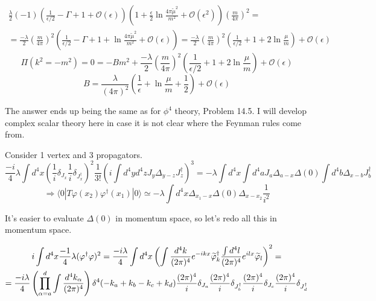 \documentclass[twoside]{amsart}
\newcommand{\solutionhead}[1]
  {\smallskip
   \noindent{\large\bf Solution #1.}
   }
\begin{document}
\[
\begin{gathered}
  \frac{ \lambda}{2} (-1) \left( \frac{1}{ \epsilon/2} -\Gamma +1 + \mathcal{O}(\epsilon) \right) \left( 1 + \frac{ \epsilon}{2} \ln{ \frac{ 4\pi \widetilde{\mu}^2 }{ m^2} }+ \mathcal{O}(\epsilon^2) \right) \left( \frac{m}{4\pi} \right)^2  = \\ 
  = \frac{ -\lambda}{2} \left( \frac{ m}{4\pi} \right)^2 \left( \frac{1}{ \epsilon/2} - \Gamma + 1 + \ln{ \frac{ 4\pi \widetilde{\mu}^2}{ m^2 }} + \mathcal{O}(\epsilon) \right) = \frac{ - \lambda}{2} \left( \frac{m}{4\pi} \right)^2 \left( \frac{1}{ \epsilon/2} + 1 + 2 \ln{ \frac{ \mu}{m}} \right) + \mathcal{O}(\epsilon) 
\end{gathered}
\]
\[
\Pi(k^2 =  - m^2 ) = 0 = - Bm^2 + \frac{ -\lambda}{2} \left( \frac{m}{4\pi} \right)^2 \left( \frac{1}{ \epsilon/2} + 1 + 2 \ln{ \frac{ \mu}{m }  } \right) + \mathcal{O}(\epsilon) 
\]
\[
\boxed{ B = \frac{ \lambda}{  ( 4\pi)^2 } \left( \frac{1}{ \epsilon} + \ln{ \frac{ \mu}{m} } + \frac{1}{2} \right) + \mathcal{O}(\epsilon) }
\]











\solutionhead{14.6} 

The answer ends up being the same as for $\phi^4$ theory, Problem 14.5.  I will develop complex scalar theory here in case it is not clear where the Feynman rules come from.  

Consider 1 vertex and 3 propagators.  
\[
\frac{-i}{4} \lambda \int d^4x \left( \frac{1}{i} \delta_{J_x} \frac{1}{i} \delta_{J_x^{\dag}} \right)^2 \frac{1}{3!} \left( i \int d^4y d^4z J_y \Delta_{y-z} J_z^{\dag} \right)^3 =  -\lambda \int d^4x \int d^4a J_a \Delta_{a-x} \Delta(0) \int d^4b \Delta_{x-b} J_b^{\dag}
\]
\[
\Longrightarrow \langle 0 | T \varphi(x_2) \varphi^{\dag}(x_1) | 0 \rangle \simeq  - \lambda \int d^4x \Delta_{x_1-x} \Delta(0) \Delta_{x-x_2} \frac{1}{i^2}
\]

It's easier to evaluate $\Delta(0)$ in momentum space, so let's redo all this in momentum space.  

 \begin{gather}
   i \int d^4x \frac{-1}{4}  \lambda ( \varphi^{\dag} \varphi)^2  = \frac{ - i \lambda}{4} \int d^4x \left( \int \frac{ d^4k }{(2\pi)^4} e^{-ikx} \widetilde{\varphi}^{\dag}_k \frac{ \int d^4l }{ (2\pi)^4} e^{i lx} \widetilde{\varphi}_{l } \right)^2 = \notag \\ 
    = \frac{- i \lambda}{4} \left( \prod_{\alpha = a }^d \int \frac{ d^4k_{\alpha}}{ (2\pi)^4} \right) \delta^4( - k_a + k_b - k_c + k_d) \frac{ (2\pi)^4}{i} \delta_{J_a} \frac{ (2\pi)^4}{i } \delta_{J^{\dag}_b} \frac{ (2\pi)^4}{ i } \delta_{J_c} \frac{ (2\pi)^4}{i } \delta_{J_d^{\dag}} \label{Eq:complexscalar_3prop}
 \end{gather}
\end{document}
